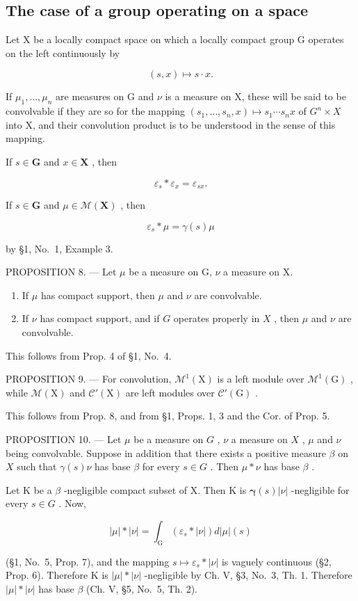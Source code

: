 \subsection{The case of a group operating on a space}

Let X be a locally compact space on which a locally compact group G operates on the left continuously by

\[
(s, x) \mapsto s \cdot x.
\]

If \(\mu_{1},\ldots,\mu_{n}\) are measures on G and \(\nu\) is a measure on X, these will be said to be convolvable if they are so for the mapping \((s_{1},\ldots,s_{n},x)\mapsto s_{1}\cdots s_{n}x\) of \(G^{n}\times X\) into X, and their convolution product is to be understood in the sense of this mapping.

If \(s\in \mathbf{G}\) and \(x\in \mathbf{X}\) , then

\[
\varepsilon_ {s} * \varepsilon_ {x} = \varepsilon_ {s x}.\tag{4}
\]

If \(s \in \mathbf{G}\) and \(\mu \in \mathcal{M}(\mathbf{X})\) , then

\[
\varepsilon_ {s} * \mu = \gamma (s) \mu\tag{5}
\]

by §1, No.~1, Example 3.

PROPOSITION 8. --- Let \(\mu\) be a measure on G, \(\nu\) a measure on X.

\begin{enumerate}
\def\labelenumi{(\roman{enumi})}
\item
  If \(\mu\) has compact support, then \(\mu\) and \(\nu\) are convolvable.
\item
  If \(\nu\) has compact support, and if \(G\) operates properly in \(X\) , then \(\mu\) and \(\nu\) are convolvable.
\end{enumerate}

This follows from Prop. 4 of §1, No.~4.

PROPOSITION 9. --- For convolution, \(\mathcal{M}^{1}(\mathrm{X})\) is a left module over \(\mathcal{M}^{1}(\mathrm{G})\) , while \(\mathcal{M}(\mathrm{X})\) and \(\mathcal{C}'(\mathrm{X})\) are left modules over \(\mathcal{C}'(\mathrm{G})\) .

This follows from Prop. 8, and from §1, Props. 1, 3 and the Cor. of Prop. 5.

PROPOSITION 10. --- Let \(\mu\) be a measure on \(G\) , \(\nu\) a measure on \(X\) , \(\mu\) and \(\nu\) being convolvable. Suppose in addition that there exists a positive measure \(\beta\) on \(X\) such that \(\gamma(s)\nu\) has base \(\beta\) for every \(s \in G\) . Then \(\mu * \nu\) has base \(\beta\) .

Let K be a \(\beta\) -negligible compact subset of X. Then K is \(\pmb{\gamma}(s)|\nu|\) -negligible for every \(s \in G\) . Now,

\[
| \mu | * | \nu | = \int_ {\mathrm{G}} (\varepsilon_ {s} * | \nu |) d | \mu | (s)
\]

(§1, No.~5, Prop. 7), and the mapping \(s \mapsto \varepsilon_s * |\nu|\) is vaguely continuous (§2, Prop. 6). Therefore K is \(|\mu| * |\nu|\) -negligible by Ch. V, §3, No.~3, Th. 1. Therefore \(|\mu| * |\nu|\) has base \(\beta\) (Ch. V, §5, No.~5, Th. 2).
